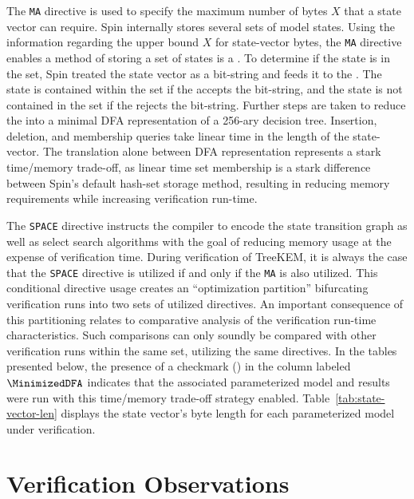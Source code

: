 The \texttt{MA} directive is used to specify the maximum number of bytes \(X\) that a state vector can require.
Spin internally stores several sets of model states.
Using the information regarding the upper bound \(X\) for state-vector bytes, the \texttt{MA} directive enables a method of storing a set of states is a  \autocite{holzmann1999minimized}.
To determine if the state is in the set, Spin treated the state vector as a bit-string and feeds it to the .
The state is contained within the set if the  accepts the bit-string, and the state is not contained in the set if the  rejects the bit-string.
Further steps are taken to reduce the  into a minimal DFA representation of a 256-ary decision tree.
Insertion, deletion, and membership queries take linear time in the length of the state-vector.
The translation alone between DFA representation represents a stark time/memory trade-off, as linear time set membership is a stark difference between Spin's default hash-set storage method, resulting in reducing memory requirements while increasing verification run-time.

The \texttt{SPACE} directive instructs the compiler to encode the state transition graph as well as select search algorithms with the goal of reducing memory usage at the expense of verification time.
During verification of TreeKEM, it is always the case that the \texttt{SPACE} directive is utilized if and only if the \texttt{MA} is also utilized.
This conditional directive usage creates an ``optimization partition'' bifurcating verification runs into two sets of utilized directives.
An important consequence of this partitioning relates to comparative analysis of the verification run-time characteristics.
Such comparisons can only soundly be compared with other verification runs within the same set, utilizing the same directives.
In the tables presented below, the presence of a checkmark (\cmark) in the column labeled $\MinimizedDFA$ indicates that the associated parameterized model and results were run with this time/memory trade-off strategy enabled.
Table\ \ref{tab:state-vector-len} displays the state vector's byte length for each \CGKAmod{\VersionOne}{}{} parameterized model under verification.


\hypertarget{sec:verification-observations}{%
\section{Verification Observations}\label{sec:verification-observations}}

